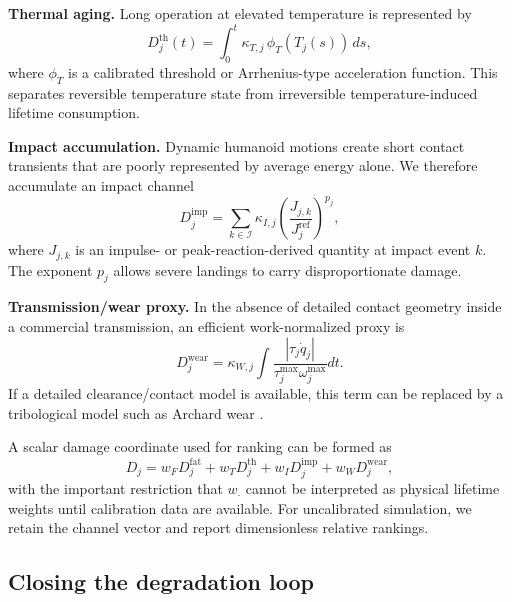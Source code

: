 \documentclass[letterpaper,10pt,conference]{ieeeconf}
\begin{document}
\textbf{Thermal aging.} Long operation at elevated temperature is represented by
\begin{equation}
D^{\mathrm{th}}_j(t)=
\int_0^t \kappa_{T,j}\,\phi_T(T_j(s))\,ds,
\label{eq:thermalaging}
\end{equation}
where $\phi_T$ is a calibrated threshold or Arrhenius-type acceleration function. This separates reversible temperature state from irreversible temperature-induced lifetime consumption.

\textbf{Impact accumulation.} Dynamic humanoid motions create short contact transients that are poorly represented by average energy alone. We therefore accumulate an impact channel
\begin{equation}
D^{\mathrm{imp}}_j=
\sum_{k\in\mathcal{I}}
\kappa_{I,j}
\left(\frac{J_{j,k}}{J^{\mathrm{ref}}_j}\right)^{p_j},
\label{eq:impact}
\end{equation}
where $J_{j,k}$ is an impulse- or peak-reaction-derived quantity at impact event $k$. The exponent $p_j$ allows severe landings to carry disproportionate damage.

\textbf{Transmission/wear proxy.} In the absence of detailed contact geometry inside a commercial transmission, an efficient work-normalized proxy is
\begin{equation}
D^{\mathrm{wear}}_j=
\kappa_{W,j}
\int
\frac{|\tau_j\dot q_j|}
{\tau_j^{\max}\omega_j^{\max}}dt.
\label{eq:wear}
\end{equation}
If a detailed clearance/contact model is available, this term can be replaced by a tribological model such as Archard wear \cite{archard1953}.

A scalar damage coordinate used for ranking can be formed as
\begin{equation}
D_j=
w_FD^{\mathrm{fat}}_j+w_TD^{\mathrm{th}}_j+
 w_ID^{\mathrm{imp}}_j+w_WD^{\mathrm{wear}}_j,
\label{eq:totaldamage}
\end{equation}
with the important restriction that $w_\cdot$ cannot be interpreted as physical lifetime weights until calibration data are available. For uncalibrated simulation, we retain the channel vector and report dimensionless relative rankings.

\subsection{Closing the degradation loop}
\end{document}
